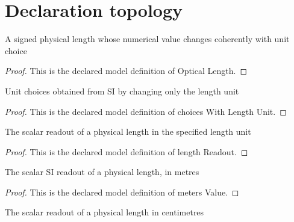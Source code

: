 \section{Declaration topology}
\begin{definition}
  \label{def:physics:phyx-mini-0038:phyxminiproblems-problemphyxmini0038-opticallength}
  A signed physical length whose numerical value changes coherently with unit choice
\end{definition}
\begin{proof}
  This is the declared model definition of Optical Length.
\end{proof}
\begin{definition}
  \label{def:physics:phyx-mini-0038:phyxminiproblems-problemphyxmini0038-choiceswithlengthunit}
  Unit choices obtained from SI by changing only the length unit
\end{definition}
\begin{proof}
  This is the declared model definition of choices With Length Unit.
\end{proof}
\begin{definition}
  \label{def:physics:phyx-mini-0038:phyxminiproblems-problemphyxmini0038-lengthreadout}
  The scalar readout of a physical length in the specified length unit
\end{definition}
\begin{proof}
  This is the declared model definition of length Readout.
\end{proof}
\begin{definition}
  \label{def:physics:phyx-mini-0038:phyxminiproblems-problemphyxmini0038-metersvalue}
  The scalar SI readout of a physical length, in metres
\end{definition}
\begin{proof}
  This is the declared model definition of meters Value.
\end{proof}
\begin{definition}
  \label{def:physics:phyx-mini-0038:phyxminiproblems-problemphyxmini0038-centimetersvalue}
  The scalar readout of a physical length in centimetres
\end{definition}
